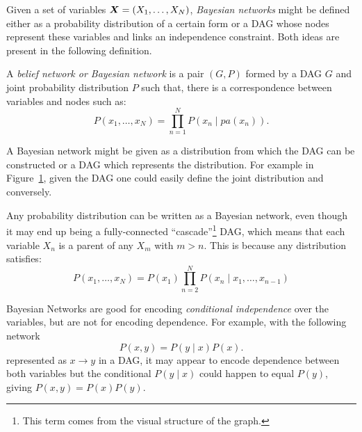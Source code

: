 
Given a set of variables \(\bm{X} = (X_{1},\dots,X_{N})\), \emph{Bayesian networks} might be defined either as a probability distribution of a certain form or a DAG whose nodes represent these variables and links an independence constraint. Both ideas are present in the following definition.

\begin{definition}
  A \emph{belief network or Bayesian network} is a pair \((G,P)\) formed by a DAG \(G\) and  joint probability distribution \(P\) such that, there is a correspondence between variables and nodes such as:
  \[
    P(x_{1},\dots,x_{N}) = \prod_{n=1}^{N}P(x_{n}\mid pa(x_{n})).
  \]
\end{definition}

\begin{remark}
  A Bayesian network might be given as a distribution from which the DAG can be constructed or a DAG which represents the distribution. For example in Figure~\ref{fig:bn_example}, given the DAG one could easily define the joint distribution and conversely.
\end{remark}

\begin{figure}[h!]
  \centering
    \label{fig:bn_example}
\end{figure}

Any probability distribution can be written as a Bayesian network, even though
it may end up being a fully-connected ``cascade''\footnote{This term comes from the visual structure of the graph.} DAG, which means that each variable \( X_n \) is a parent of any \( X_m \) with \( m > n \). This is because any distribution satisfies:
\[
   P(x_1, \dots, x_{N}) = P(x_1) \prod_{n=2}^{N}P(x_{n} \mid x_{1},\dots, x_{n-1})
 \]

Bayesian Networks are good for encoding \emph{conditional independence} over the
variables, but are not for encoding dependence. For example, with the following
network
\[
P(x,y) = P(y\mid x)P(x).
\]
represented as \(x \to y\) in a DAG, it may appear to encode dependence between both variables but the conditional \(P(y\mid x)\) could happen to equal \(P(y)\), giving \(P(x,y) = P(x)P(y)\).

